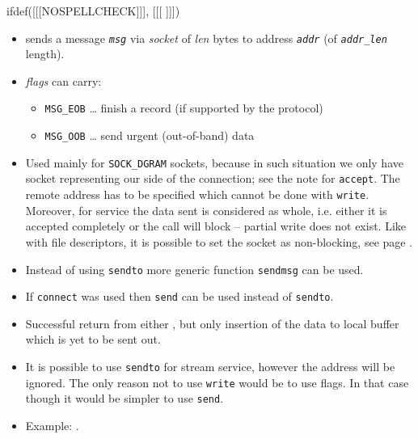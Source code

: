 \begin{slide}
ifdef([[[NOSPELLCHECK]]], [[[
]]])
\begin{itemize}
\item sends a message \emph{\texttt{msg}} via \emph{socket} of \emph{l{}en}
bytes to address \emph{\texttt{addr}} (of \emph{\texttt{addr\_len}} length). 
\item \emph{flags} can carry:
    \begin{itemize}
    \item \texttt{MSG\_EOB} \dots{} finish a record (if supported by the
    protocol)
    \item \texttt{MSG\_OOB} \dots{} send urgent (out-of-band) data
    \end{itemize}
\end{itemize}
\end{slide}

\begin{itemize}
\item Used mainly for \texttt{SOCK\_DGRAM} sockets, because in such situation
we only have socket representing our side of the connection; see the note
for \texttt{accept}. The remote address has to be specified which cannot be
done with \texttt{write}. Moreover, for  service the data sent
is considered as whole, i.e. either it is accepted completely or the call
will block -- partial write does not exist. Like with file descriptors, it is
possible to set the socket as non-blocking, see page \pageref{FCNTL}.
\item Instead of using \texttt{sendto} more generic function \texttt{sendmsg}
can be used.
\item If \texttt{connect} was used then \texttt{send} can be used instead of
\texttt{sendto}.
\item Successful return from either , but only insertion of the data to local buffer
which is yet to be sent out.
\item It is possible to use \texttt{sendto} for stream service, however the
address will be ignored. The only reason not to use \texttt{write} would be to
use flags. In that case though it would be simpler to use \texttt{send}.
\item Example: .
\end{itemize}

